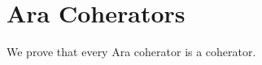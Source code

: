 \section{Ara Coherators} \label{sec: ara coherators}

We prove that every Ara coherator is a coherator.